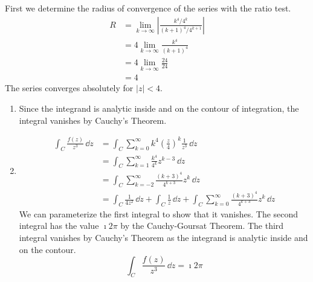 {\begin{Solution}
  First we determine the radius of convergence of the series with the 
  ratio test.
  \begin{align*}
    R
    &= \lim_{k \to \infty} \left| \frac{ k^4 / 4^k }{ (k + 1)^4 / 4^{k + 1} } \right|
    \\
    &= 4 \lim_{k \to \infty} \frac{ k^4 }{ (k + 1)^4 }
    \\
    &= 4 \lim_{k \to \infty} \frac{ 24 }{ 24 }
    \\
    &= 4
  \end{align*}
  The series converges absolutely for $|z| < 4$.
  \begin{enumerate}
  \item 
    Since the integrand is analytic inside and on the contour of integration,
    the integral vanishes by Cauchy's Theorem.
  \item 
    \begin{align*}
      \int_C \frac{f(z)}{z^3}\,\dd z
      &= \int_C \sum_{k=0}^\infty k^4 \left( \frac{z}{4} \right)^k \frac{1}{z^3}\,\dd z
      \\
      &= \int_C \sum_{k=1}^\infty \frac{k^4}{4^k} z^{k-3}\,\dd z
      \\
      &= \int_C \sum_{k = -2}^\infty \frac{(k+3)^4}{4^{k + 3}} z^k\,\dd z
      \\
      &= \int_C \frac{1}{4 z^2}\,\dd z + \int_C \frac{1}{z}\,\dd z 
      + \int_C \sum_{k = 0}^\infty \frac{(k+3)^4}{4^{k + 3}} z^k\,\dd z
    \end{align*}
    We can parameterize the first integral to show that it vanishes.  The second
    integral has the value $\imath 2 \pi$ by the Cauchy-Goursat Theorem.  The third
    integral vanishes by Cauchy's Theorem as the integrand is analytic
    inside and on the contour.
    \[
    \int_C \frac{f(z)}{z^3}\,\dd z = \imath 2 \pi
    \]
  \end{enumerate}
\end{Solution}












\raggedbottom
}
